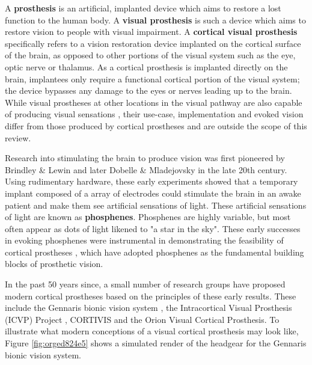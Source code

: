 \documentclass[a4paper,11pt,openany]{book}
\begin{document}
A \textbf{prosthesis} is an artificial, implanted device which aims to restore a lost function to the human body. \cite{thurston_pare_2007}
A \textbf{visual prosthesis} is such a device which aims to restore vision to people with visual impairment. \cite{weiland_visual_2008,ong_bionic_2012}
A \textbf{cortical visual prosthesis} specifically refers to a vision restoration device implanted on the cortical surface of the brain, as opposed to other portions of the visual system such as the eye, optic nerve or thalamus. \cite{lewis_restoration_2015}
As a cortical prosthesis is implanted directly on the brain, implantees only require a functional cortical portion of the visual system; the device bypasses any damage to the eyes or nerves leading up to the brain.
While visual prostheses at other locations in the visual pathway are also capable of producing visual sensations \cite{humayun_visual_1996,stingl_interim_2017,veraart_visual_1998,panetsos_consistent_2011}, their use-case, implementation and evoked vision differ from those produced by cortical prostheses and are outside the scope of this review.

Research into stimulating the brain to produce vision was first pioneered by Brindley \& Lewin \cite{brindley_sensations_1968} and later Dobelle \& Mladejovsky \cite{dobelle_phosphenes_1974} in the late 20th century.
Using rudimentary hardware, these early experiments showed that a temporary implant composed of a array of electrodes could stimulate the brain in an awake patient and make them see artificial sensations of light. \cite{brindley_sensations_1968,dobelle_phosphenes_1974}
These artificial sensations of light are known as \textbf{phosphenes}.
Phosphenes are highly variable, but most often appear as dots of light likened to "a star in the sky". \cite{dobelle_phosphenes_1974}
These early successes in evoking phosphenes were instrumental in demonstrating the feasibility of cortical prostheses \cite{schmidt_feasibility_1996}, which have adopted phosphenes as the fundamental building blocks of prosthetic vision.

In the past 50 years since, a small number of research groups have proposed modern cortical prostheses based on the principles of these early results.
These include the Gennaris bionic vision system \cite{lowery_restoration_2015,lowery_monash_2017}, the Intracortical Visual Prosthesis (ICVP) Project \cite{troyk_intracortical_2017}, CORTIVIS \cite{fernandez_cortivis_2017} and the Orion Visual Cortical Prosthesis. \cite{secondsight_second_nodate}
To illustrate what modern conceptions of a visual cortical prosthesis may look like, Figure \ref{fig:orged824e5} shows a simulated render of the headgear for the Gennaris bionic vision system.
\end{document}
